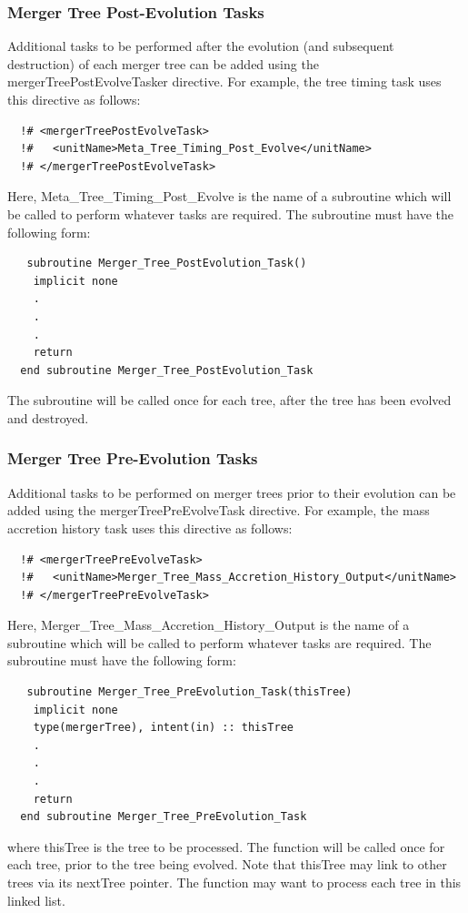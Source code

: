 \subsubsection{Merger Tree Post-Evolution Tasks}\label{sec:MergerTreePostEvolveTask}

Additional tasks to be performed after the evolution (and subsequent destruction) of each merger tree can be added using the {\normalfont \ttfamily mergerTreePostEvolveTasker} directive. For example, the tree timing task uses this directive as follows:
\begin{verbatim}
  !# <mergerTreePostEvolveTask>
  !#   <unitName>Meta_Tree_Timing_Post_Evolve</unitName>
  !# </mergerTreePostEvolveTask>
\end{verbatim}
Here, {\normalfont \ttfamily Meta\_Tree\_Timing\_Post\_Evolve} is the name of a subroutine which will be called to perform whatever tasks are required. The subroutine must have the following form:
\begin{verbatim}
   subroutine Merger_Tree_PostEvolution_Task()
    implicit none
    .
    .
    .
    return
  end subroutine Merger_Tree_PostEvolution_Task
\end{verbatim}
The subroutine will be called once for each tree, after the tree has been evolved and destroyed.

\subsubsection{Merger Tree Pre-Evolution Tasks}\label{sec:MergerTreePreEvolveTask}

Additional tasks to be performed on merger trees prior to their evolution can be added using the {\normalfont \ttfamily mergerTreePreEvolveTask} directive. For example, the mass accretion history task uses this directive as follows:
\begin{verbatim}
  !# <mergerTreePreEvolveTask>
  !#   <unitName>Merger_Tree_Mass_Accretion_History_Output</unitName>
  !# </mergerTreePreEvolveTask>
\end{verbatim}
Here, {\normalfont \ttfamily Merger\_Tree\_Mass\_Accretion\_History\_Output} is the name of a subroutine which will be called to perform whatever tasks are required. The subroutine must have the following form:
\begin{verbatim}
   subroutine Merger_Tree_PreEvolution_Task(thisTree)
    implicit none
    type(mergerTree), intent(in) :: thisTree
    .
    .
    .
    return
  end subroutine Merger_Tree_PreEvolution_Task
\end{verbatim}
where {\normalfont \ttfamily thisTree} is the tree to be processed. The function will be called once for each tree, prior to the tree being evolved. Note that {\normalfont \ttfamily thisTree} may link to other trees via its {\normalfont \ttfamily nextTree} pointer. The function may want to process each tree in this linked list.

